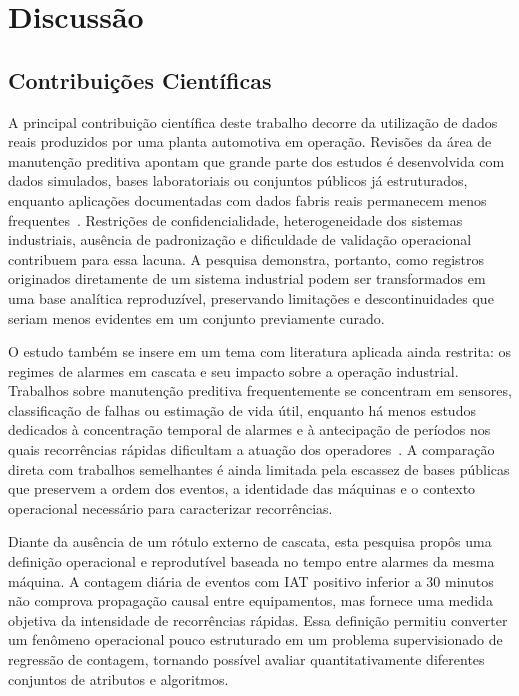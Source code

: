 \section{Discussão}
\label{sec:discussao}

\subsection{Contribuições Científicas}

A principal contribuição científica deste trabalho decorre da utilização de dados reais produzidos por uma planta automotiva em operação. Revisões da área de manutenção preditiva apontam que grande parte dos estudos é desenvolvida com dados simulados, bases laboratoriais ou conjuntos públicos já estruturados, enquanto aplicações documentadas com dados fabris reais permanecem menos frequentes~\cite{pdm4.0}. Restrições de confidencialidade, heterogeneidade dos sistemas industriais, ausência de padronização e dificuldade de validação operacional contribuem para essa lacuna. A pesquisa demonstra, portanto, como registros originados diretamente de um sistema industrial podem ser transformados em uma base analítica reproduzível, preservando limitações e descontinuidades que seriam menos evidentes em um conjunto previamente curado.

O estudo também se insere em um tema com literatura aplicada ainda restrita: os regimes de alarmes em cascata e seu impacto sobre a operação industrial. Trabalhos sobre manutenção preditiva frequentemente se concentram em sensores, classificação de falhas ou estimação de vida útil, enquanto há menos estudos dedicados à concentração temporal de alarmes e à antecipação de períodos nos quais recorrências rápidas dificultam a atuação dos operadores~\cite{rahaman2025alarmfloods}. A comparação direta com trabalhos semelhantes é ainda limitada pela escassez de bases públicas que preservem a ordem dos eventos, a identidade das máquinas e o contexto operacional necessário para caracterizar recorrências.

Diante da ausência de um rótulo externo de cascata, esta pesquisa propôs uma definição operacional e reprodutível baseada no tempo entre alarmes da mesma máquina. A contagem diária de eventos com IAT positivo inferior a 30 minutos não comprova propagação causal entre equipamentos, mas fornece uma medida objetiva da intensidade de recorrências rápidas. Essa definição permitiu converter um fenômeno operacional pouco estruturado em um problema supervisionado de regressão de contagem, tornando possível avaliar quantitativamente diferentes conjuntos de atributos e algoritmos.

